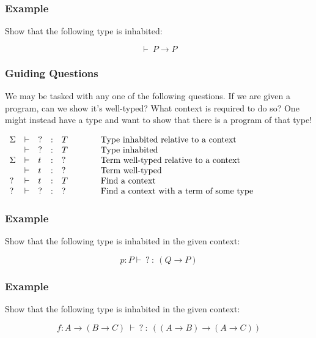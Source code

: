 \documentclass{beamer}
\theoremstyle{indentDefn} \newtheorem{defn}[]{Definition}
\begin{document}
\begin{frame}
  \frametitle{Example}

  Show that the following type is inhabited: 

  $$ \vdash \ P \to P$$

  \vspace{7cm}
\end{frame}


\begin{frame}
  \frametitle{Guiding Questions}

  We may be tasked with any one of the following questions. If we are given a program, can we show it's well-typed? What context is required to do so? One might instead have a type and want to show that there is a program of that type!

  \begin{center}
    $\begin{array}{l l l l l l}
      \Sigma & \vdash & ? & : & T & \hspace{1cm} \text{Type inhabited relative to a context} \\
      \ & \vdash & ? & : & T & \hspace{1cm} \text{Type inhabited} \\
      \Sigma & \vdash & t & : & ? & \hspace{1cm} \text{Term well-typed relative to a context} \\
      \ & \vdash & t & : & ? & \hspace{1cm} \text{Term well-typed} \\
      ? & \vdash & t & : & T & \hspace{1cm} \text{Find a context} \\
      ? & \vdash & ? & : & ? & \hspace{1cm} \text{Find a context with a term of some type}
    \end{array}$
\end{center}
\end{frame}

\begin{frame}
  \frametitle{Example}

  Show that the following type is inhabited in the given context:

  $$ p : P \vdash \ ? \ : \ (Q \to P)$$

  \vspace{7cm}
\end{frame}

\begin{frame}
  \frametitle{Example}

  Show that the following type is inhabited in the given context:

  $$ f : A \to (B \to C) \ \vdash \ ? \ : \ ((A \to B) \to (A \to C))$$

  \vspace{7cm}
\end{frame}
\end{document}
